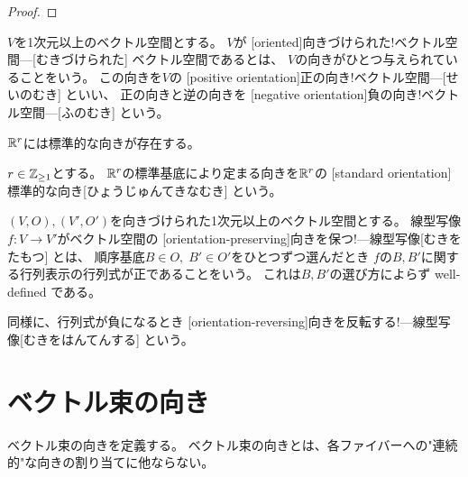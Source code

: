 \documentclass[report]{jlreq}
\begin{document}
\begin{proof}
    \TODO{}
\end{proof}

\begin{definition}[向きづけられたベクトル空間]
    $V$を1次元以上のベクトル空間とする。
    $V$が
    [oriented]{向きづけられた!ベクトル空間---}[むきづけられた]
    ベクトル空間であるとは、
    $V$の向きがひとつ与えられていることをいう。
    この向きを$V$の
    [positive orientation]{正の向き!ベクトル空間---}[せいのむき]
    といい、
    正の向きと逆の向きを
    [negative orientation]{負の向き!ベクトル空間---}[ふのむき]
    という。
\end{definition}

$\mathbb{R}^r$には標準的な向きが存在する。

\begin{definition}[標準的な向き]
    $r \in \mathbb{Z}_{\ge 1}$とする。
    $\mathbb{R}^r$の標準基底により定まる向きを$\mathbb{R}^r$の
    [standard orientation]{標準的な向き}[ひょうじゅんてきなむき]
    という。
\end{definition}

\begin{definition}[向きを保つ線型写像]
    $(V, O), (V', O')$を向きづけられた1次元以上のベクトル空間とする。
    線型写像$f \colon V \to V'$がベクトル空間の
    [orientation-preserving]{向きを保つ!---線型写像}[むきをたもつ]
    とは、
    順序基底$B \in O, \; B' \in O'$をひとつずつ選んだとき
    $f$の$B, B'$に関する行列表示の行列式が正であることをいう。
    これは$B, B'$の選び方によらず well-defined である。

    同様に、行列式が負になるとき
    [orientation-reversing]{向きを反転する!---線型写像}[むきをはんてんする]
    という。
\end{definition}

%
\section{ベクトル束の向き}

ベクトル束の向きを定義する。
ベクトル束の向きとは、各ファイバーへの"連続的"な向きの割り当てに他ならない。
\end{document}
